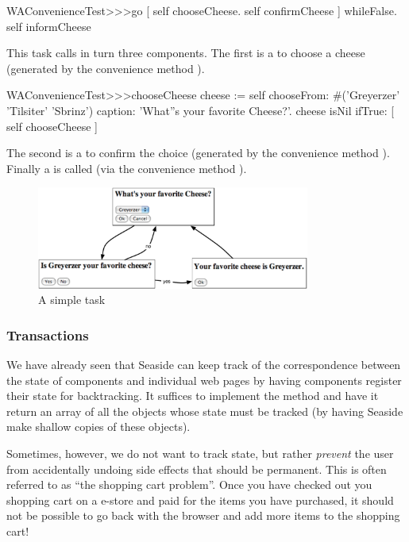 \documentclass[a4paper,10pt,twoside]{book}
\begin{document}
\begin{code}{}
WAConvenienceTest>>>go
	[ self chooseCheese.
	  self confirmCheese ] whileFalse.
	self informCheese
\end{code}

This task calls in turn three components.
The first is a  to choose a cheese (generated by the convenience method ).

\begin{code}{}
WAConvenienceTest>>>chooseCheese
	cheese := self
		chooseFrom: #('Greyerzer' 'Tilsiter' 'Sbrinz')
		caption: 'What''s your favorite Cheese?'.
	cheese isNil ifTrue: [ self chooseCheese ]
\end{code}

The second is a  to confirm the choice (generated by the convenience method ).
Finally a  is called (via the convenience method ).

\begin{figure}[ht]
\begin{center}
\includegraphics[width=0.8\textwidth]{chooseCheese}
\caption{A simple task}
\label{fig:chooseCheese}
\end{center}
\end{figure}

\subsubsection{Transactions}

We have already seen that Seaside can keep track of the correspondence between the state of components and individual web pages by having components register their state for backtracking.
It suffices to implement the method  and have it return an array of all the objects whose state must be tracked (\ie by having Seaside make shallow copies of these objects).

Sometimes, however, we do not want to track state, but rather \emph{prevent} the user from accidentally undoing side effects that should be permanent.
This is often referred to as ``the shopping cart problem''.
Once you have checked out you shopping cart on a e-store and paid for the items you have purchased, it should not be possible to go back with the browser and add more items to the shopping cart!
\end{document}
